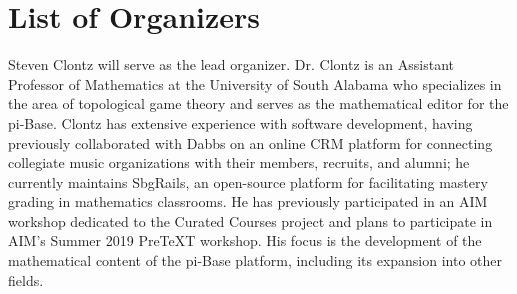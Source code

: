 \documentclass{amsart}
\newcommand{\TODO}[1]{\textcolor{red}{(TODO: #1)}}
\begin{document}



\section{List of Organizers}

Steven Clontz will serve as the lead organizer. Dr. Clontz is an Assistant
Professor of Mathematics at the University of South Alabama who specializes
in the area of topological game theory and serves as the mathematical editor
for the pi-Base. 
Clontz has extensive experience with software development, having
previously collaborated with Dabbs on an online CRM platform for connecting
collegiate music organizations with their members, recruits, and alumni;
he currently maintains SbgRails, an open-source platform 
for facilitating mastery grading in mathematics classrooms. He has
previously participated in an AIM workshop dedicated to the Curated Courses
project and plans to participate in AIM's Summer 2019 PreTeXT workshop. 
His focus is the development of the mathematical content
of the pi-Base platform, including its expansion into other fields.
\end{document}
